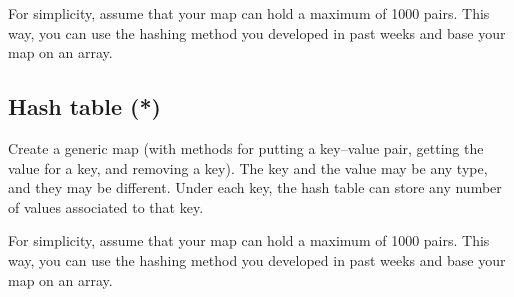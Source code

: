 \documentclass{article}
\begin{document}
For simplicity, assume that your map can hold a maximum of 1000
pairs. This way, you can use the hashing method you developed in past
weeks and base your map on an array. 

\subsection{Hash table (*)}
\label{sec:array-based-impl}

Create a generic map (with methods for putting a key--value pair,
getting the value for a key, and removing a key). The key and the
value may be any type, and they may be different. Under each key, the
hash table can store any number of values associated to that key. 

For simplicity, assume that your map can hold a maximum of 1000
pairs. This way, you can use the hashing method you developed in past
weeks and base your map on an array. 
\end{document}
